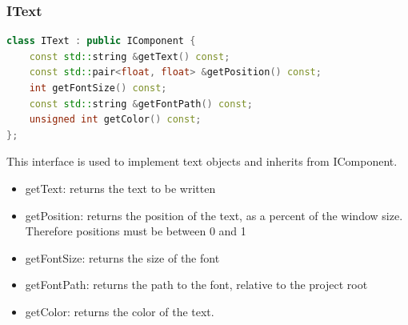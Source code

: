 \documentclass[12pt]{article}
\begin{document}
\subsubsection{IText}
\begin{lstlisting}[language=c++]
class IText : public IComponent {
	const std::string &getText() const;
    const std::pair<float, float> &getPosition() const;
	int getFontSize() const;
	const std::string &getFontPath() const;
	unsigned int getColor() const;
};
\end{lstlisting}
This interface is used to implement text objects and inherits from IComponent.
\begin{itemize}
    \item getText: returns the text to be written
    \item getPosition: returns the position of the text, as a percent of the window size. Therefore positions must be between 0 and 1
    \item getFontSize: returns the size of the font
    \item getFontPath: returns the path to the font, relative to the project root
    \item getColor: returns the color of the text.
\end{itemize}
\end{document}
